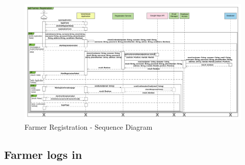 \newpage
\begin{landscape}
\begin{figure}[h]
\vspace*{-2cm}
\noindent
\centering
\centerline{\includegraphics[scale= 0.108]{./Images/Sequence diagram/Farmer Registration Sequence Diagram.png}}
    \caption{Farmer Registration - Sequence Diagram}
    \vspace*{-12cm}
\end{figure}
\fillandplacepagenumber
\end{landscape}

\subsection{Farmer logs in}

